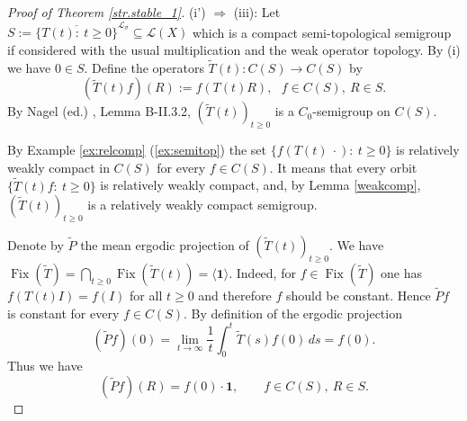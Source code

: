 \documentclass[11pt,intlimits, draft,oneside]{amsart}
\theoremstyle{definition}
\newcommand\Eins{\mathbf{1}}
\def\Fix{\mathop{\mathrm{Fix}}}
\def\dd{\,d}
\def\LLL{\mathcal{L}}
\begin{document}
\begin{proof}[Proof of Theorem \ref{str.stable_1}]
\smallskip\noindent (i') $\Rightarrow$ (iii): Let
$S:=\overline{\{T(t):\:t\geq 0\} }^{\LLL_\sigma}\subseteq\LLL(X)$
which is a compact semi-topological semigroup if considered with the
usual multiplication and the weak operator topology. By (i) we have
$0\in S$. Define the operators $\tilde{T}(t):C(S) \to C(S)$ by
%
\begin{equation*}
(\tilde{T}(t)f)(R):= f(T(t)R), \ \ \ f\in C(S),\: R\in S.
\end{equation*}
By Nagel (ed.) \cite{nagel:1986}, Lemma B-II.3.2,
$(\tilde{T}(t))_{t\geq 0}$ is a $C_0$-semigroup on $C(S)$.

By Example \ref{ex:relcomp} (\ref{ex:semitop}) the set
$\{f(T(t)\:\cdot):\: t\geq 0\}$ is relatively weakly compact in
$C(S)$ for every $f\in C(S)$. It means that every orbit
$\{\tilde{T}(t)f:\: t\geq 0\}$ is relatively weakly compact, and,
 by Lemma \ref{weakcomp}, $(\tilde{T}(t))_{t\geq0}$ is a
relatively weakly compact semigroup.


\smallskip Denote by $\tilde{P}$ the mean ergodic projection of
$(\tilde{T}(t))_{t\geq0}$. We have $\Fix(\tilde{T})=\bigcap_{t\geq
0}\Fix(\tilde{T}(t))=\langle \Eins \rangle$. Indeed, for $f\in
\Fix(\tilde T)$ one has $f(T(t)I)=f(I)$ for all $t\geq 0$ and
therefore $f$ should be constant. Hence  $\tilde{P}f$ is constant
for every $f\in C(S)$. By definition of the ergodic projection
%
\begin{equation}\label{eq:meaner}
(\tilde{P}f)(0)=\lim_{t\to\infty} \frac{1}{t} \int_0^t
\tilde{T}(s)f(0)\dd s= f(0).
\end{equation}
Thus we have
%
\begin{equation}\label{eq:tildeP}
(\tilde{P}f)(R)= f(0)\cdot \Eins,\qquad f\in C(S),\: R\in S.
\end{equation}


\end{proof}
\end{document}
